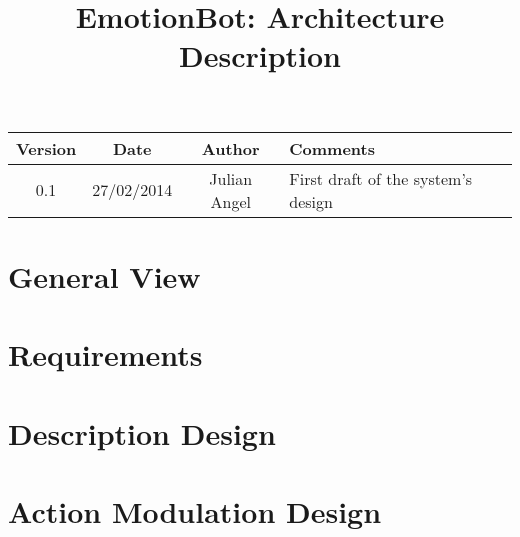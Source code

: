 \documentclass[10pt,a4paper,oneside]{book}
\begin{document}
	\title{EmotionBot: Architecture Description}
	\maketitle
	\tableofcontents
	\newpage
	\begin{center}
		\begin{tabular}{|c|c|c|p{5.5 cm}|}
		\hline
		Version & Date &Author & Comments\\
		\hline
		 0.1&27/02/2014&Julian Angel & First draft of the system's design\\
		 \hline
		\end{tabular}
	\end{center}
	\newpage
	\chapter{General View}
	
	
	
	
	\chapter{Requirements}
	
	\chapter{Description Design}
	\chapter{Action Modulation Design}
\end{document}
